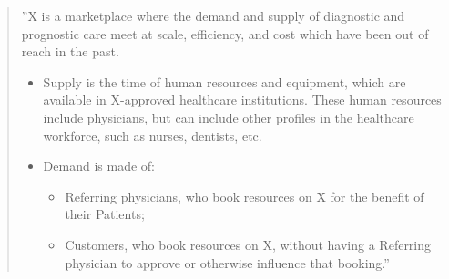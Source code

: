 \documentclass[graybox,envcountchap,sectrefs]{svmono}
\begin{document}
\begin{quote}
''X is a marketplace where the demand and supply of diagnostic and prognostic care meet at scale, efficiency, and cost which have been out of reach in the past.
\begin{itemize}
	\item Supply is the time of human resources and equipment, which are available in X-approved healthcare institutions. These human resources include physicians, but can include other profiles in the healthcare workforce, such as nurses, dentists, etc. 
	\item Demand is made of:
	\begin{itemize}
		\item Referring physicians, who book resources on X for the benefit of their Patients;
		\item Customers, who book resources on X, without having a Referring physician to approve or otherwise influence that booking.''
	\end{itemize}
\end{itemize}
\end{quote}
\end{document}
